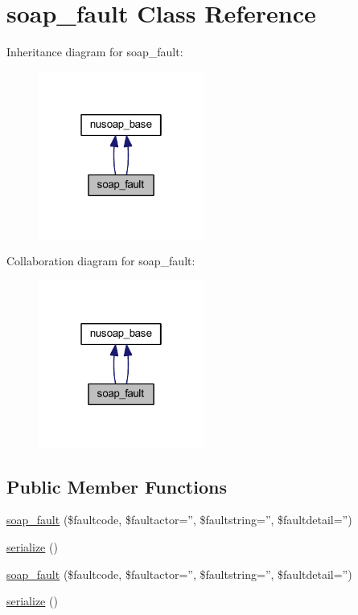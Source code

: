 \hypertarget{classsoap__fault}{\section{soap\-\_\-fault Class Reference}
\label{classsoap__fault}
}


Inheritance diagram for soap\-\_\-fault\-:
\nopagebreak
\begin{figure}[H]
\begin{center}
\leavevmode
\includegraphics[width=154pt]{classsoap__fault__inherit__graph}
\end{center}
\end{figure}


Collaboration diagram for soap\-\_\-fault\-:
\nopagebreak
\begin{figure}[H]
\begin{center}
\leavevmode
\includegraphics[width=154pt]{classsoap__fault__coll__graph}
\end{center}
\end{figure}
\subsection*{Public Member Functions}
\begin{DoxyCompactItemize}
\item 
\hyperlink{classsoap__fault_a5ff5d34258399b8240be578db7def943}{soap\-\_\-fault} (\$faultcode, \$faultactor='', \$faultstring='', \$faultdetail='')
\item 
\hyperlink{classsoap__fault_a4d9813fea8525b19a1d370eeb8fe41d6}{serialize} ()
\item 
\hyperlink{classsoap__fault_a5ff5d34258399b8240be578db7def943}{soap\-\_\-fault} (\$faultcode, \$faultactor='', \$faultstring='', \$faultdetail='')
\item 
\hyperlink{classsoap__fault_a4d9813fea8525b19a1d370eeb8fe41d6}{serialize} ()
\end{DoxyCompactItemize}
